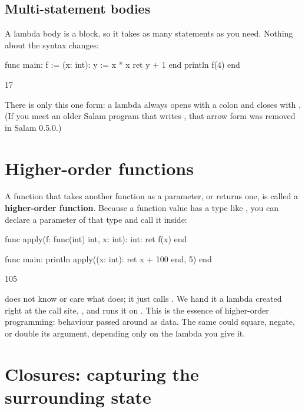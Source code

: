 \subsection{Multi-statement bodies}

A lambda body is a block, so it takes as many statements as you need. Nothing
about the syntax changes:

\begin{salamen}
func main:
    f := (x: int):
        y := x * x
        ret y + 1
    end
    println f(4)
end
\end{salamen}

\begin{progout}
17
\end{progout}

There is only this one form: a lambda always opens with a colon and closes with
. (If you meet an older Salam program that writes
, that arrow form was removed in Salam 0.5.0.)

\section{Higher-order functions}

A function that takes another function as a parameter, or returns one, is
called a \textbf{higher-order function}. Because a function value has a type like
, you can declare a parameter of that type and call it inside:

\begin{salamen}
func apply(f: func(int) int, x: int): int:
    ret f(x)
end

func main:
    println apply((x: int): ret x + 100 end, 5)
end
\end{salamen}

\begin{progout}
105
\end{progout}

 does not know or care what  does; it just calls .
We hand it a lambda created right at the call site,
, and
 runs it on . This is the essence of higher-order
programming: behaviour passed around as data. The same  could square,
negate, or double its argument, depending only on the lambda you give it.

\section{Closures: capturing the surrounding state}

